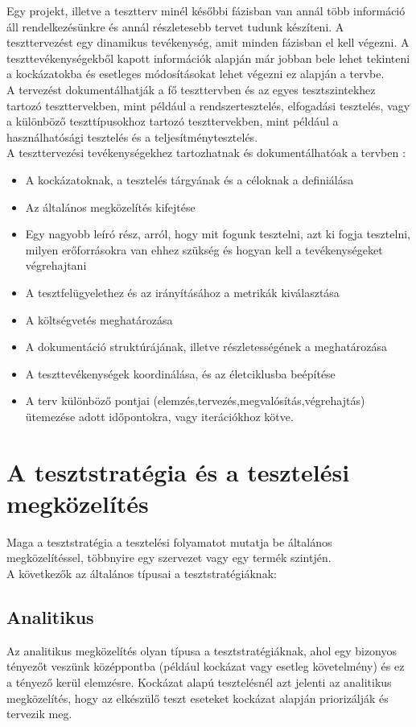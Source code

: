 Egy projekt, illetve a tesztterv minél későbbi fázisban van annál több információ áll rendelkezésünkre és annál részletesebb tervet tudunk készíteni. A teszttervezést egy dinamikus tevékenység, amit minden fázisban el kell végezni. A teszttevékenységekből kapott információk alapján már jobban bele lehet tekinteni a kockázatokba és esetleges módosításokat lehet végezni ez alapján a tervbe.\\
A tervezést dokumentálhatják a fő teszttervben és az egyes tesztszintekhez tartozó teszttervekben, mint például a rendszertesztelés, elfogadási tesztelés, vagy a különböző teszttípusokhoz tartozó teszttervekben, mint például a használhatósági tesztelés és a teljesítménytesztelés\cite[~67. oldal]{syllabus3}.\\
A teszttervezési tevékenységekhez tartozhatnak és dokumentálhatóak a tervben :
\begin{itemize}
\item A kockázatoknak, a tesztelés tárgyának és a céloknak a definiálása
\item Az általános megközelítés kifejtése
\item Egy nagyobb leíró rész, arról, hogy mit fogunk tesztelni, azt ki fogja tesztelni, milyen erőforrásokra van ehhez szükség és hogyan kell a tevékenységeket végrehajtani
\item A tesztfelügyelethez és az irányításához a metrikák kiválasztása
\item A költségvetés meghatározása
\item A dokumentáció struktúrájának, illetve részletességének a meghatározása
\item A teszttevékenységek koordinálása, és az életciklusba beépítése
\item A terv különböző pontjai (elemzés,tervezés,megvalósítás,végrehajtás) ütemezése adott időpontokra, vagy iterációkhoz kötve.
\end{itemize}

\section {A tesztstratégia és a tesztelési megközelítés}

Maga a tesztstratégia a tesztelési folyamatot mutatja be általános megközelítéssel, többnyire egy szervezet vagy egy termék szintjén.\\
A következők az általános típusai a tesztstratégiáknak:
\subsection{Analitikus} Az analitikus megközelítés olyan típusa a tesztstratégiáknak, ahol egy bizonyos tényezőt veszünk középpontba (például kockázat vagy esetleg követelmény) és ez a tényező kerül elemzésre.
Kockázat alapú tesztelésnél azt jelenti az analitikus megközelítés, hogy az elkészülő teszt eseteket kockázat alapján priorizálják és tervezik meg.


